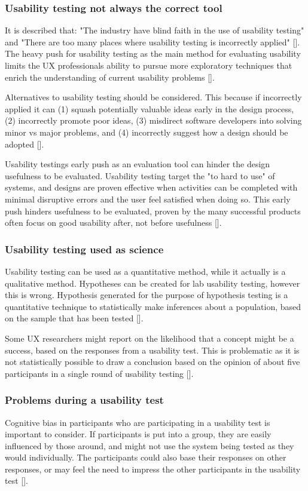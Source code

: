 \subsubsection{Usability testing not always the correct tool}
It is described that: "The industry have blind faith in the use of usability testing" and "There are too many places where usability testing is incorrectly applied" [\cite{pgd_2020}]. The heavy push for usability testing as the main method for evaluating usability limits the UX professionals ability to pursue more exploratory techniques that enrich the understanding of current usability problems [\cite{pgd_2020}]. 

Alternatives to usability testing should be considered. This because if incorrectly applied it can (1) squash potentially valuable ideas early in the design process, (2) incorrectly promote poor ideas, (3) misdirect software developers into solving minor vs major problems, and (4) incorrectly suggest how a design should be adopted [\cite{sg_2008}].

Usability testings early push as an evaluation tool can hinder the design usefulness to be evaluated. Usability testing target the "to hard to use" of systems, and designs are proven effective when activities can be completed with minimal disruptive errors and the user feel satisfied when doing so. This early push hinders usefulness to be evaluated, proven by the many successful products often focus on good usability after, not before usefulness [\cite{sg_2008}].

\subsubsection{Usability testing used as science}
Usability testing can be used as a quantitative method, while it actually is a qualitative method. Hypotheses can be created for lab usability testing, however this is wrong. Hypothesis generated for the purpose of hypothesis testing is a quantitative technique to statistically make inferences about a population, based on the sample that has been tested [\cite{pgd_2020}].

Some UX researchers might report on the likelihood that a concept might be a success, based on the responses from a usability test. This is problematic as it is not statistically possible to draw a conclusion based on the opinion of about five participants in a single round of usability testing [\cite{pgd_2020}].

\subsubsection{Problems during a usability test} \label{sec:problems-during-a-usability-test}
Cognitive bias in participants who are participating in a usability test is important to consider. If participants is put into a group, they are easily influenced by those around, and might not use the system being tested as they would individually. The participants could also base their responses on other responses, or may feel the need to impress the other participants in the usability test [\cite{dn_2016}].

